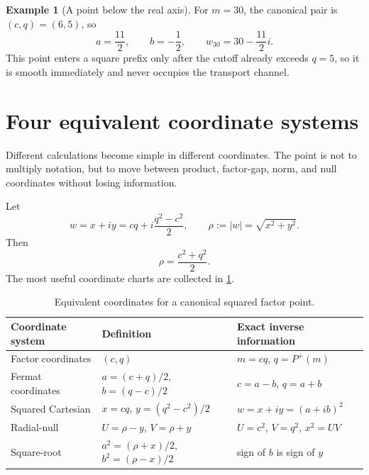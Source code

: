 \documentclass[11pt]{article}
\theoremstyle{definition}
\newtheorem{example}[theorem]{Example}
\newcommand{\Pplus}{P^{+}}
\newcommand{\1}{\mathbf{1}}
\begin{document}
\begin{example}[A point below the real axis]
For $m=30$, the canonical pair is $(c,q)=(6,5)$, so
\[
 a=\frac{11}{2},
 \qquad
 b=-\frac12,
 \qquad
 w_{30}=30-\frac{11}{2}i.
\]
This point enters a square prefix only after the cutoff already exceeds $q=5$, so it is smooth immediately and never occupies the transport channel.
\end{example}


\section{Four equivalent coordinate systems}
\label{sec:coordinates}

Different calculations become simple in different coordinates.  The point is not to multiply notation, but to move between product, factor-gap, norm, and null coordinates without losing information.

Let
\begin{equation}
 w=x+iy
 =cq+i\frac{q^2-c^2}{2},
 \qquad
 \rho:=|w|=\sqrt{x^2+y^2}.
 \label{eq:w-rho}
\end{equation}
Then
\begin{equation}
 \rho=\frac{c^2+q^2}{2}.
 \label{eq:rho-cq}
\end{equation}
The most useful coordinate charts are collected in \cref{tab:coordinates}.

\begin{table}[htbp]
\centering
\caption{Equivalent coordinates for a canonical squared factor point.}
\label{tab:coordinates}
\renewcommand{\arraystretch}{1.35}
\begin{tabular}{>{\raggedright\arraybackslash}p{} >{\raggedright\arraybackslash}p{} >{\raggedright\arraybackslash}p{}}
\toprule
Coordinate system & Definition & Exact inverse information\\
\midrule
Factor coordinates & $(c,q)$ & $m=cq$, $q=\Pplus(m)$\\
Fermat coordinates & $a=(c+q)/2$, $b=(q-c)/2$ & $c=a-b$, $q=a+b$\\
Squared Cartesian & $x=cq$, $y=(q^2-c^2)/2$ & $w=x+iy=(a+ib)^2$\\
Radial-null & $U=\rho-y$, $V=\rho+y$ & $U=c^2$, $V=q^2$, $x^2=UV$\\
Square-root & $a^2=(\rho+x)/2$, $b^2=(\rho-x)/2$ & sign of $b$ is sign of $y$\\
\bottomrule
\end{tabular}
\end{table}
\end{document}
